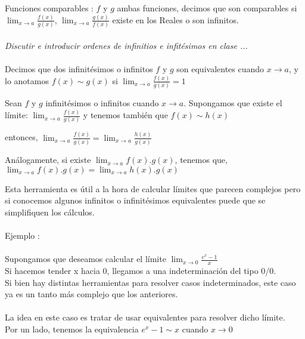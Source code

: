 \documentclass[11pt, a4paper]{article}
\begin{document}
{Funciones comparables : $f$ y $g$ ambas funciones, decimos que son comparables si $ \displaystyle \lim_{x\to a} \frac{f(x)}{g(x)} $, $ \displaystyle \lim_{x\to a} \frac{g(x)}{f(x)} $  existe en los Reales o son infinitos. \\ \\ 
\textit{{\color{red} Discutir e introducir ordenes de infinitios e infit\'esimos en clase ... }} \\ \\ 
Decimos que dos infinit\'esimos o infinitos $f$ y $g$ son {\color{blue} equivalentes} cuando $x \to a$, y lo anotamos 
{\color{blue} $ f(x) \sim  g(x)  $} si {\color{blue}$ \displaystyle \lim_{x\to a} \frac{f(x)}{g(x)} = 1 $} \\ 
\begin{center}
    Sean $f$ y $g$ infinit\'esimos o infinitos cuando $x \to a $. Supongamos que existe el l\'imite: $ \displaystyle \lim_{x\to a} \frac{f(x)}{g(x)} $ y tenemos tambi\'en que $ f(x) \sim h(x) $ \\ \hfill

    entonces, {\color{blue}$ \displaystyle \lim_{x\to a} \frac{f(x)}{g(x)} =  \lim_{x\to a} \frac{h(x)}{g(x)}  $} \\ \hfill

    An\'alogamente, si existe $ \displaystyle \lim_{ x\to a} f(x).g(x) $, tenemos que, \\ {\color{blue} $ \displaystyle \lim_{ x\to a} f(x).g(x) = \lim_{ x\to a} h(x).g(x) $ } \\ \hfill

    
\end{center}
Esta herramienta es \'util a la hora de calcular l\'imites que parecen complejos pero si conocemos algunos infinitos o infinit\'esimos equivalentes puede que se simplifiquen los c\'alculos. \\ \\

{\color{green} Ejemplo : } \\ \\
Supongamos que deseamos calcular el l\'imite {\color{blue}$ \displaystyle \lim_{ x \to 0 } \frac{e^{x} - 1}{x} $} \\ 
Si hacemos tender x hacia 0, llegamos a una indeterminaci\'on del tipo 0/0. \\
Si bien hay distintas herramientas para resolver casos indeterminados, este caso ya es un tanto m\'as complejo que los anteriores. \\ \\ La idea en este caso es tratar de usar {\color{blue} equivalentes} para resolver dicho l\'imite. \\
Por un lado, tenemos la equivalencia {\color{blue}$ e^{x} - 1 \sim x $} cuando {\color{blue}$x \to 0$} \\ 

}
\end{document}
